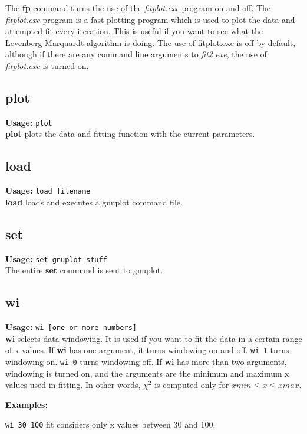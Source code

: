         The {\bf fp} command turns the use of the {\em fitplot.exe}
 program on and off.  The {\em fitplot.exe} program is a fast
 plotting program which is used to plot the data and
 attempted fit every iteration.  This is useful if you want
 to see what the Levenberg-Marquardt algorithm is doing.
 The use of fitplot.exe is off by default, although if there
 are any command line arguments to {\em fit2.exe}, the use of
 {\em fitplot.exe} is turned on.
 

\subsection{plot}   {\bf Usage: } {\tt  plot} \\

        {\bf plot} plots the data and fitting function with the
 current parameters.

\subsection{load}   {\bf Usage: } {\tt  load filename} \\

        {\bf load} loads and executes a gnuplot command file.

\subsection{set}    {\bf Usage: } {\tt  set gnuplot stuff} \\

        The entire {\bf set} command is sent to gnuplot.

\subsection{wi}     {\bf Usage: } {\tt  wi [one or more numbers]} \\

        {\bf wi} selects data windowing.  It is used if you want
 to fit the data in a certain range of x values.  If {\bf wi} has
 one argument, it turns windowing on and off.  {\tt wi 1} turns
 windowing on.  {\tt wi 0} turns windowing off.  If {\bf wi} has more
 than two arguments, windowing is turned on, and the
 arguments are the minimum and maximum x values used in
 fitting.  In other words, $\chi^2$ is computed only for
 $xmin \le x \le xmax$.

 {\bf Examples:}
 
 {\tt wi 30 100} fit considers only x values between 30 and 100.

